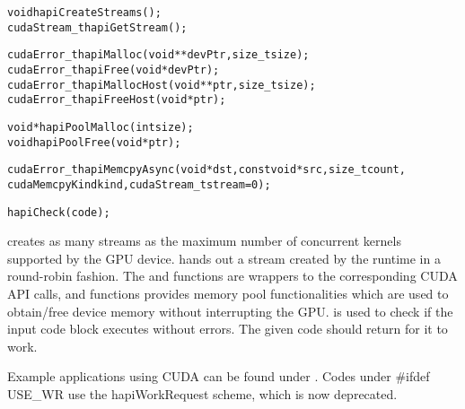 \begin{alltt}
  void hapiCreateStreams();
  cudaStream_t hapiGetStream();

  cudaError_t hapiMalloc(void** devPtr, size_t size);
  cudaError_t hapiFree(void* devPtr);
  cudaError_t hapiMallocHost(void** ptr, size_t size);
  cudaError_t hapiFreeHost(void* ptr);

  void* hapiPoolMalloc(int size);
  void hapiPoolFree(void* ptr);

  cudaError_t hapiMemcpyAsync(void* dst, const void* src, size_t count,
                              cudaMemcpyKind kind, cudaStream_t stream = 0);

  hapiCheck(code);
\end{alltt}

 creates as many streams as the maximum number of
concurrent kernels supported by the GPU device.  hands
out a stream created by the runtime in a round-robin fashion. The
 and  functions are wrappers to the corresponding
CUDA API calls, and  functions provides memory pool functionalities
which are used to obtain/free device memory without interrupting the GPU.
 is used to check if the input code block executes without errors.
The given code should return  for it to work.

Example \charmpp{} applications using CUDA can be found under
. Codes under #ifdef USE_WR use the hapiWorkRequest
scheme, which is now deprecated.
